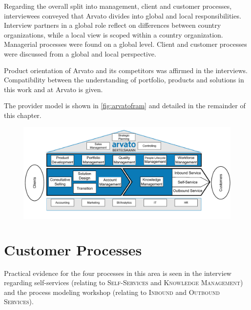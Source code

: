 	Regarding the overall split into management, client and customer processes, interviewees conveyed that Arvato divides into global and local responsibilities.
	Interview partners in a global role reflect on differences between country organizations, while a local view is scoped within a country organization. Managerial processes were found on a global level. Client and customer processes were discussed from a global and local perspective. 
	
	Product orientation of Arvato and its competitors was affirmed in the interviews. Compatibility between the understanding of portfolio, products and solutions in this work and at Arvato is given.
	
	 The provider model is shown in \Fig \ref{fig:arvatofram} and detailed in the remainder of this chapter.
	
\begin{figure}[caption={Arvato Framework}, label={fig:arvatofram}]
	{	\includegraphics[width=.98\textwidth]{figures/frameworkA.pdf} 
	}
\end{figure}


	
	\section{Customer Processes}
	
	Practical evidence for the four processes in this area is seen in the interview regarding self-services (relating to \textsc{Self-Services} and \textsc{Knowledge Management}) and the process modeling workshop (relating to \textsc{Inbound} and \textsc{Outbound Services}).
	
